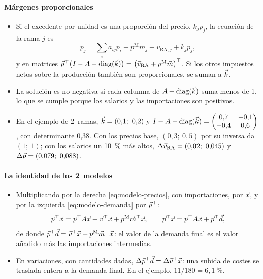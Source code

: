 \documentclass[11pt]{article}
\begin{document}
\paragraph{Márgenes proporcionales}

\begin{itemize}
\item Si el excedente por unidad es una proporción del precio, $k_jp_j$, la ecuación de la rama $j$ es
\[
p_j=\sum_i a_{ij}p_i+p^{\mathrm M}m_j+v_{\mathrm{RA},j}+k_jp_j,
\]
  y en matrices $\vec{p}^{\top}\bigl(I-A-\operatorname{diag}(\vec{k})\bigr)=\bigl(\vec{v}_{\mathrm{RA}}+p^{\mathrm M}\vec{m}\bigr)^{\top}$. Si los otros impuestos netos sobre la producción también son proporcionales, se suman a $\vec{k}$.
\item La solución es no negativa si cada columna de $A+\operatorname{diag}(\vec{k})$ suma menos de 1, lo que se cumple porque los salarios y las importaciones son positivos.
\item En el ejemplo de 2~ramas, $\vec{k}=(0{,}1;\ 0{,}2)$ y $I-A-\operatorname{diag}(\vec{k})=\begin{pmatrix}0{,}7 & -0{,}1\\ -0{,}4 & 0{,}6\end{pmatrix}$, con determinante 0,38. Con los precios base, $(0{,}3;\ 0{,}5)$ por su inversa da $(1;\ 1)$; con los salarios un 10~\% más altos, $\Delta\vect{v}_{\mathrm{RA}}=(0{,}02;\ 0{,}045)$ y $\Delta\vect{p}=(0{,}079;\ 0{,}088)$.
\end{itemize}

\paragraph{La identidad de los 2~modelos}

\begin{itemize}
\item Multiplicando por la derecha \eqref{eq:modelo-precios}, con importaciones, por $\vec{x}$, y por la izquierda \eqref{eq:modelo-demanda} por $\vec{p}^{\top}$:
\[
\vec{p}^{\top}\vec{x}=\vec{p}^{\top}A\vec{x}+\vec{v}^{\top}\vec{x}+p^{\mathrm M}\vec{m}^{\top}\vec{x},\qquad \vec{p}^{\top}\vec{x}=\vec{p}^{\top}A\vec{x}+\vec{p}^{\top}\vec{d},
\]
  de donde $\vec{p}^{\top}\vec{d}=\vec{v}^{\top}\vec{x}+p^{\mathrm M}\vec{m}^{\top}\vec{x}$: el valor de la demanda final es el valor añadido más las importaciones intermedias.
\item En variaciones, con cantidades dadas, $\Delta\vec{p}^{\top}\vec{d}=\Delta\vec{v}^{\top}\vec{x}$: una subida de costes se traslada entera a la demanda final. En el ejemplo, $11/180=6{,}1~\%$.\findemo
\end{itemize}
\end{document}
